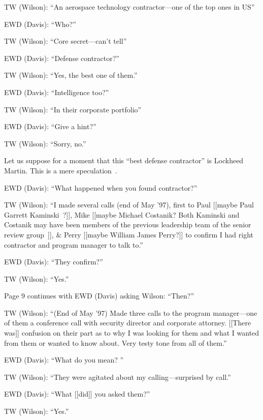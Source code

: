 \begin{svgraybox}
\noindent TW (Wilson): ``An aerospace technology contractor---one of the top ones in US''

\noindent EWD (Davis): ``Who?''

\noindent TW (Wilson): ``Core secret---can't tell''

\noindent EWD (Davis): ``Defense contractor?''

\noindent TW (Wilson): ``Yes, the best one of them.''

\noindent EWD (Davis): ``Intelligence too?''

\noindent TW (Wilson): ``In their corporate portfolio''

\noindent EWD (Davis): ``Give a hint?''

\noindent TW (Wilson): ``Sorry, no.''

Let us suppose for a moment that this ``best defense contractor'' is Lockheed Martin. This is a mere speculation~\cite{Dolan-MrX-Disclosure2020Jul}.

\noindent EWD (Davis): ``What happened when you found contractor?''

\noindent TW (Wilson): ``I made several calls (end of May '97), first to Paul
[[maybe Paul Garrett Kaminski~\cite{cox20,Dolan-MrX-Disclosure2020Jul}?]], Mike [[maybe Michael Costanik?
Both Kaminski and Costanik may have been members of the previous leadership team of the senior review group~\cite{Dolan-MrX-Disclosure2020Jul}]],
{\&} Perry [[maybe William James Perry?]] to confirm I had right contractor and program manager to talk to.''

\noindent EWD (Davis): ``They confirm?''

\noindent TW (Wilson): ``Yes.''

Page 9 continues with EWD (Davis) asking Wilson: ``Then?''

\noindent TW (Wilson): ``(End of May '97) Made three calls to the program manager---one of them a conference call with security director and corporate attorney.
[[There was]] confusion on their part as to why I was looking for them and what I wanted from them or wanted to know about. Very testy tone from all of them.''

\noindent EWD (Davis): ``What do you mean? ''

\noindent TW (Wilson): ``They were agitated about my calling---surprised by call.''

\noindent EWD (Davis): ``What [[did]] you asked them?''

\noindent TW (Wilson): ``Yes.''


\end{svgraybox}
